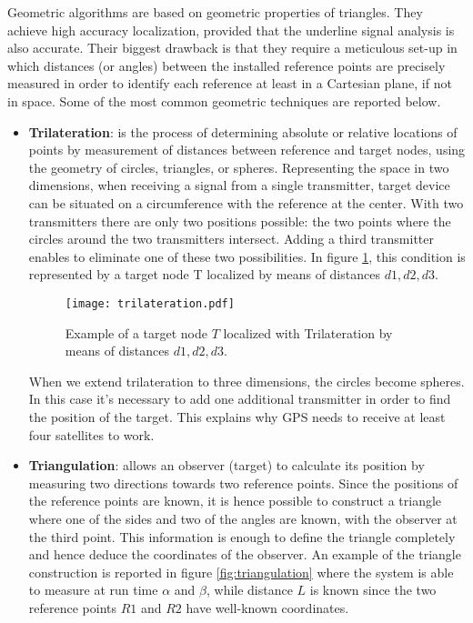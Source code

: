 Geometric algorithms are based on geometric properties of triangles. They achieve high accuracy localization, provided that the underline signal analysis is also accurate. Their biggest drawback is that they require a meticulous set-up in which distances (or angles) between the installed reference points are precisely measured in order to identify each reference at least in a Cartesian plane, if not in space. Some of the most common geometric techniques are reported below.

\begin{itemize}
\item \textbf{Trilateration}: is the process of determining absolute or relative locations of points by measurement of distances between reference and target nodes, using the geometry of circles, triangles, or spheres. Representing the space in two dimensions, when receiving a signal from a single transmitter, target device can be situated on a circumference with the reference at the center. With two transmitters there are only two positions possible: the two points where the circles around the two transmitters intersect. Adding a third transmitter enables to eliminate one of these two possibilities.
In figure \ref{fig:trilateration}, this condition is represented by a target node T localized by means of distances $d1, d2, d3$.

\begin{figure}[h!tb]
\centering\texttt{[image: trilateration.pdf]}
\caption{Example of a target node $T$ localized with Trilateration by means of distances $d1, d2, d3$.}
\label{fig:trilateration}
\end{figure}

When we extend trilateration to three dimensions, the circles become spheres. In this case it's necessary to add one additional transmitter in order to find the position of the target. This explains why GPS needs to receive at least four satellites to work.

\item \textbf{Triangulation}: allows an observer (target) to calculate its position by measuring two directions towards two reference points. Since the positions of the reference points are known, it is hence possible to construct a triangle where one of the sides and two of the angles are known, with the observer at the third point. This information is enough to define the triangle completely and hence deduce the coordinates of the observer. An example of the triangle construction is reported in figure \ref{fig:triangulation} where the system is able to measure at run time $\alpha$ and $\beta$, while distance $L$ is known since the two reference points $R1$ and $R2$ have well-known coordinates.


\end{itemize}
